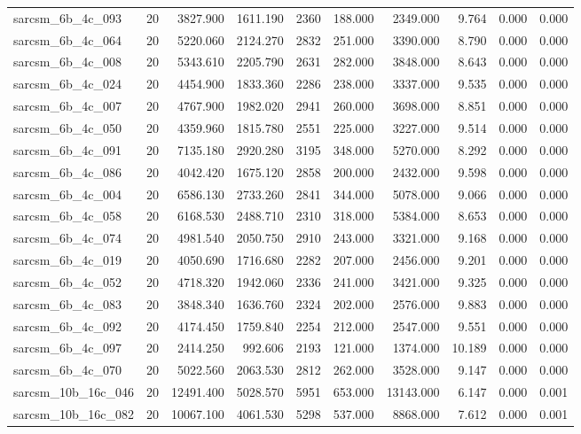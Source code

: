 \begin{tabular}{lrrrrrrrrr}
sarcsm\_6b\_4c\_093 & 20 & 3827.900 & 1611.190 & 2360 & 188.000 & 2349.000 & 9.764 & 0.000 & 0.000 \\
sarcsm\_6b\_4c\_064 & 20 & 5220.060 & 2124.270 & 2832 & 251.000 & 3390.000 & 8.790 & 0.000 & 0.000 \\
sarcsm\_6b\_4c\_008 & 20 & 5343.610 & 2205.790 & 2631 & 282.000 & 3848.000 & 8.643 & 0.000 & 0.000 \\
sarcsm\_6b\_4c\_024 & 20 & 4454.900 & 1833.360 & 2286 & 238.000 & 3337.000 & 9.535 & 0.000 & 0.000 \\
sarcsm\_6b\_4c\_007 & 20 & 4767.900 & 1982.020 & 2941 & 260.000 & 3698.000 & 8.851 & 0.000 & 0.000 \\
sarcsm\_6b\_4c\_050 & 20 & 4359.960 & 1815.780 & 2551 & 225.000 & 3227.000 & 9.514 & 0.000 & 0.000 \\
sarcsm\_6b\_4c\_091 & 20 & 7135.180 & 2920.280 & 3195 & 348.000 & 5270.000 & 8.292 & 0.000 & 0.000 \\
sarcsm\_6b\_4c\_086 & 20 & 4042.420 & 1675.120 & 2858 & 200.000 & 2432.000 & 9.598 & 0.000 & 0.000 \\
sarcsm\_6b\_4c\_004 & 20 & 6586.130 & 2733.260 & 2841 & 344.000 & 5078.000 & 9.066 & 0.000 & 0.000 \\
sarcsm\_6b\_4c\_058 & 20 & 6168.530 & 2488.710 & 2310 & 318.000 & 5384.000 & 8.653 & 0.000 & 0.000 \\
sarcsm\_6b\_4c\_074 & 20 & 4981.540 & 2050.750 & 2910 & 243.000 & 3321.000 & 9.168 & 0.000 & 0.000 \\
sarcsm\_6b\_4c\_019 & 20 & 4050.690 & 1716.680 & 2282 & 207.000 & 2456.000 & 9.201 & 0.000 & 0.000 \\
sarcsm\_6b\_4c\_052 & 20 & 4718.320 & 1942.060 & 2336 & 241.000 & 3421.000 & 9.325 & 0.000 & 0.000 \\
sarcsm\_6b\_4c\_083 & 20 & 3848.340 & 1636.760 & 2324 & 202.000 & 2576.000 & 9.883 & 0.000 & 0.000 \\
sarcsm\_6b\_4c\_092 & 20 & 4174.450 & 1759.840 & 2254 & 212.000 & 2547.000 & 9.551 & 0.000 & 0.000 \\
sarcsm\_6b\_4c\_097 & 20 & 2414.250 & 992.606 & 2193 & 121.000 & 1374.000 & 10.189 & 0.000 & 0.000 \\
sarcsm\_6b\_4c\_070 & 20 & 5022.560 & 2063.530 & 2812 & 262.000 & 3528.000 & 9.147 & 0.000 & 0.000 \\
sarcsm\_10b\_16c\_046 & 20 & 12491.400 & 5028.570 & 5951 & 653.000 & 13143.000 & 6.147 & 0.000 & 0.001 \\
sarcsm\_10b\_16c\_082 & 20 & 10067.100 & 4061.530 & 5298 & 537.000 & 8868.000 & 7.612 & 0.000 & 0.001 \\

\end{tabular}
